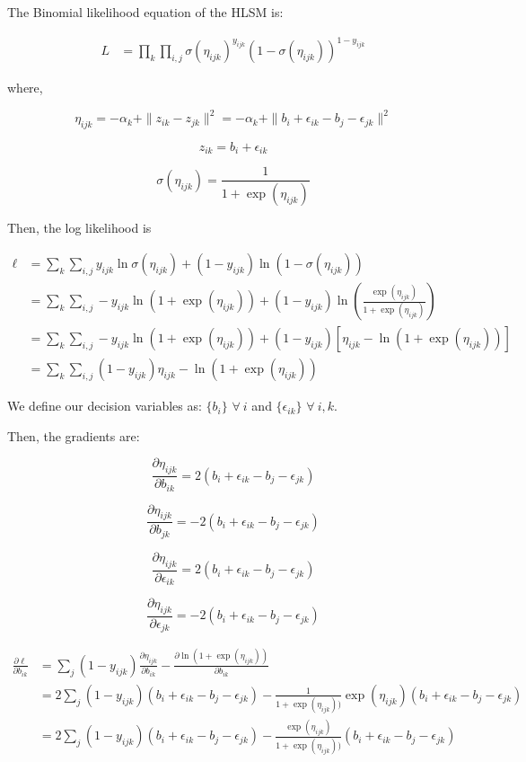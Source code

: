 \documentclass[11pt, oneside]{article}   	%
\begin{document}
The Binomial likelihood equation of the HLSM is:

\begin{align*}
  L &= \prod_k \prod_{i,j} \sigma(\eta_{ijk})^{y_{ijk}}(1-\sigma(\eta_{ijk}))^{1-y_{ijk}}
\end{align*}

where,

\[
\eta_{ijk} = -\alpha_k + \|z_{ik} - z_{jk}\|^2 =  -\alpha_k + \|b_i + \epsilon_{ik} - b_j - \epsilon_{jk}\|^2
\]

\[
z_{ik} = b_i + \epsilon_{ik}
\]

\[
\sigma(\eta_{ijk}) = \frac{1}{1+\exp(\eta_{ijk})}
\]

Then, the log likelihood is

\begin{align*}
  \ell 	&= \sum_k \sum_{i,j} {y_{ijk}} \ln \sigma(\eta_{ijk}) + (1-y_{ijk})\ln(1- \sigma(\eta_{ijk})) \\
  	&= \sum_k \sum_{i,j} - {y_{ijk}} \ln (1+\exp(\eta_{ijk})) + (1-y_{ijk})\ln\left (\frac{\exp(\eta_{ijk})}{1+\exp(\eta_{ijk})}\right) \\
  	&= \sum_k \sum_{i,j} - {y_{ijk}} \ln (1+\exp(\eta_{ijk})) + (1-y_{ijk})[\eta_{ijk} - \ln (1+\exp(\eta_{ijk}))] \\
 	& = \sum_k \sum_{i,j} (1-y_{ijk})\eta_{ijk} - \ln (1+\exp(\eta_{ijk}))
\end{align*}

We define our decision variables as: $\{b_i\}$ $\forall~i$ and $\{\epsilon_{ik}\}$ $\forall~i,k$.

Then, the gradients are:

\[
\frac{\partial \eta_{ijk}}{\partial b_{ik}} = 2(b_i + \epsilon_{ik} - b_j - \epsilon_{jk})
\]

\[
\frac{\partial \eta_{ijk}}{\partial b_{jk}} = - 2(b_i + \epsilon_{ik} - b_j - \epsilon_{jk})
\]

\[
\frac{\partial \eta_{ijk}}{\partial \epsilon_{ik}} = 2(b_i + \epsilon_{ik} - b_j - \epsilon_{jk})
\]

\[
\frac{\partial \eta_{ijk}}{\partial \epsilon_{jk}} = - 2(b_i + \epsilon_{ik} - b_j - \epsilon_{jk})
\]

\begin{align*}
\frac{\partial \ell}{\partial b_{ik}} & =  \sum_{j} (1-y_{ijk})\frac{\partial \eta_{ijk}}{\partial b_{ik}} - \frac{\partial \ln (1+\exp(\eta_{ijk}))}{\partial b_{ik}} \\
& = 2 \sum_{j} (1-y_{ijk}) (b_i + \epsilon_{ik} - b_j - \epsilon_{jk}) - \frac{1}{1+\exp(\eta_{ijk}))}\exp(\eta_{ijk})(b_i + \epsilon_{ik} - b_j - \epsilon_{jk}) \\
& = 2 \sum_{j} (1-y_{ijk}) (b_i + \epsilon_{ik} - b_j - \epsilon_{jk}) - \frac{\exp(\eta_{ijk})}{1+\exp(\eta_{ijk}))}(b_i + \epsilon_{ik} - b_j - \epsilon_{jk}) \\
\end{align*}
\end{document}

